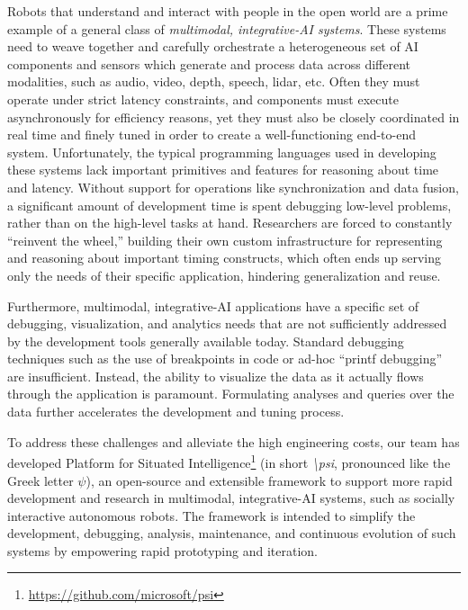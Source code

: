 \documentclass[letterpaper]{article} %
\newcommand{\psifnospace}{\emph{\textbackslash psi}}
\begin{document}
Robots that understand and interact with people in the open world are a prime example of a general class of \emph{multimodal, integrative-AI systems}. These systems need to weave together and carefully orchestrate a heterogeneous set of AI components and sensors which generate and process data across different modalities, such as audio, video, depth, speech, lidar, etc. Often they must operate under strict latency constraints, and components must execute asynchronously for efficiency reasons, yet they must also be closely coordinated in real time and finely tuned in order to create a well-functioning end-to-end system. Unfortunately, the typical programming languages used in developing these systems lack important primitives and features for reasoning about time and latency. Without support for operations like synchronization and data fusion, a significant amount of development time is spent debugging low-level problems, rather than on the high-level tasks at hand. Researchers are forced to constantly ``reinvent the wheel,'' building their own custom infrastructure for representing and reasoning about important timing constructs, which often ends up serving only the needs of their specific application, hindering generalization and reuse.

Furthermore, multimodal, integrative-AI applications have a specific set of debugging, visualization, and analytics needs that are not sufficiently addressed by the development tools generally available today. Standard debugging techniques such as the use of breakpoints in code or ad-hoc ``printf debugging'' are insufficient. Instead, the ability to visualize the data as it actually flows through the application is paramount. Formulating analyses and queries over the data further accelerates the development and tuning process.

To address these challenges and alleviate the high engineering costs, our team has developed Platform for Situated Intelligence\footnote{\url{https://github.com/microsoft/psi}} (in short \psifnospace, pronounced like the Greek letter $\psi$), an open-source  and extensible framework to support more rapid development and research in multimodal, integrative-AI systems, such as socially interactive autonomous robots. The framework is intended to simplify the development, debugging, analysis, maintenance, and continuous evolution of such systems by empowering rapid prototyping and iteration.
\end{document}
